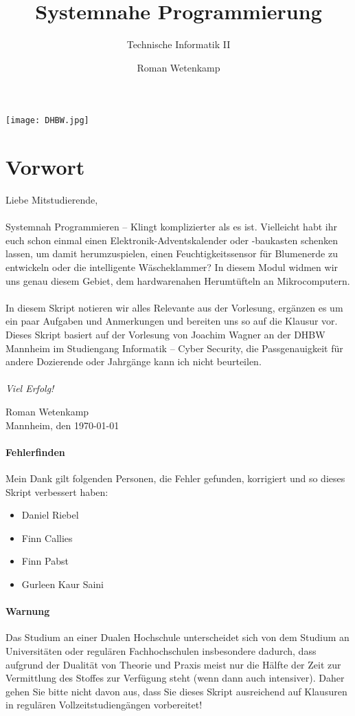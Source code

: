 \documentclass[11pt,a4paper]{scrartcl}
\author{Roman Wetenkamp}
\title{Systemnahe Programmierung}
\subtitle{Technische Informatik II}
\begin{document}
\vspace{3cm}
\maketitle
\begin{center}
\texttt{[image: DHBW.jpg]}
\end{center}
\pagebreak
\tableofcontents
\pagebreak
\section*{Vorwort}
Liebe Mitstudierende, \\\\
Systemnah Programmieren -- Klingt komplizierter als es ist. Vielleicht habt ihr euch schon einmal einen Elektronik-Adventskalender oder -baukasten schenken lassen, um damit herumzuspielen, einen Feuchtigkeitssensor für Blumenerde zu entwickeln oder die intelligente Wäscheklammer? In diesem Modul widmen wir uns genau diesem Gebiet, dem hardwarenahen Herumtüfteln an Mikrocomputern. \\\\
In diesem Skript notieren wir alles Relevante aus der Vorlesung, ergänzen es um ein paar Aufgaben und Anmerkungen und bereiten uns so auf die Klausur vor. Dieses Skript basiert auf der Vorlesung von Joachim Wagner an der DHBW Mannheim im Studiengang Informatik -- Cyber Security, die Passgenauigkeit für andere Dozierende oder Jahrgänge kann ich nicht beurteilen. \\\\
\textit{Viel Erfolg!}  \\
\begin{flushright}
Roman Wetenkamp \\
Mannheim, den \today
\end{flushright}  
\vfill
\paragraph{Fehlerfinden}
Mein Dank gilt folgenden Personen, die Fehler gefunden, korrigiert und so dieses Skript verbessert haben: 
\begin{itemize}
\item Daniel Riebel
\item Finn Callies
\item Finn Pabst
\item Gurleen Kaur Saini
\end{itemize}
\paragraph{Warnung}
Das Studium an einer Dualen Hochschule unterscheidet sich von dem Studium an Universitäten oder regulären Fachhochschulen insbesondere dadurch, dass aufgrund der Dualität von Theorie und Praxis meist nur die Hälfte der Zeit zur Vermittlung des Stoffes zur Verfügung steht (wenn dann auch intensiver). Daher gehen Sie bitte nicht davon aus, dass Sie dieses Skript ausreichend auf Klausuren in regulären Vollzeitstudiengängen vorbereitet!
\end{document}
